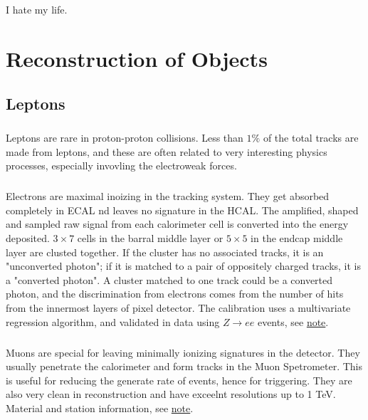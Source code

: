 \begin{savequote}[75mm]
I hate my life.
\end{savequote}

\chapter{Reconstruction of Objects}

\section{Leptons}
\paragraph{}
Leptons are rare in proton-proton collisions. Less than $1\%$ of the total tracks are made from leptons, and these are often related to very interesting physics processes, especially invovling the electroweak forces.

\paragraph{}
Electrons are maximal inoizing in the tracking system. They get absorbed completely in ECAL nd leaves no signature in the HCAL. The amplified, shaped and sampled raw signal from each calorimeter cell is converted into the energy deposited. $3\times 7$ cells in the barral middle layer or $ 5 \times 5$ in the endcap middle layer are clusted together. If the cluster has no associated tracks, it is an "unconverted photon"; if it is matched to a pair of oppositely charged tracks, it is a "converted photon". A cluster matched to one track could be a converted photon, and the discrimination from electrons comes from the number of hits from the innermost layers of pixel detector. The calibration uses a multivariate regression algorithm, and validated in data using $Z \to ee$ events, see \href{https://atlas.web.cern.ch/Atlas/GROUPS/PHYSICS/PUBNOTES/ATL-PHYS-PUB-2016-015/}{note}.

\paragraph{}
Muons are special for leaving minimally ionizing signatures in the detector. They usually penetrate the calorimeter and form tracks in the Muon Spetrometer. This is useful for reducing the generate rate of events, hence for triggering. They are also very clean in reconstruction and have exceelnt resolutions up to 1 TeV. Material and station information, see \href{https://cds.cern.ch/record/2252613/files/ATL-COM-MUON-2017-005.pdf}{note}.

